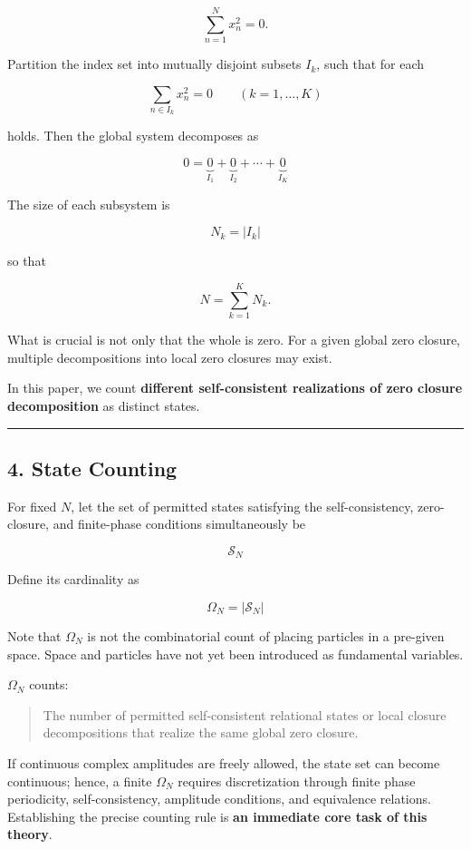 \documentclass[
  a4paper,
]{article}
\begin{document}
\[
\sum_{n=1}^{N}x_n^2=0.
\]

Partition the index set into mutually disjoint subsets \(I_k\), such
that for each

\[
\sum_{n\in I_k}x_n^2=0
\qquad
(k=1,\ldots,K)
\tag{4}
\]

holds. Then the global system decomposes as

\[
0
=
\underbrace{0}_{I_1}
+
\underbrace{0}_{I_2}
+\cdots+
\underbrace{0}_{I_K}
\tag{5}
\]

The size of each subsystem is

\[
N_k=|I_k|
\]

so that

\[
N=\sum_{k=1}^{K}N_k.
\tag{6}
\]

What is crucial is not only that the whole is zero. For a given global
zero closure, multiple decompositions into local zero closures may
exist.

In this paper, we count \textbf{different self-consistent realizations
of zero closure decomposition} as distinct states.

\begin{center}\rule{0.5\linewidth}{0.5pt}\end{center}

\subsection{4. State Counting}\label{state-counting}

For fixed \(N\), let the set of permitted states satisfying the
self-consistency, zero-closure, and finite-phase conditions
simultaneously be

\[
\mathcal{S}_N
\]

Define its cardinality as

\[
\Omega_N
=
|\mathcal{S}_N|
\tag{7}
\]

Note that \(\Omega_N\) is not the combinatorial count of placing
particles in a pre-given space. Space and particles have not yet been
introduced as fundamental variables.

\(\Omega_N\) counts:

\begin{quote}
The number of permitted self-consistent relational states or local
closure decompositions that realize the same global zero closure.
\end{quote}

If continuous complex amplitudes are freely allowed, the state set can
become continuous; hence, a finite \(\Omega_N\) requires discretization
through finite phase periodicity, self-consistency, amplitude
conditions, and equivalence relations. Establishing the precise counting
rule is \textbf{an immediate core task of this theory}.
\end{document}
